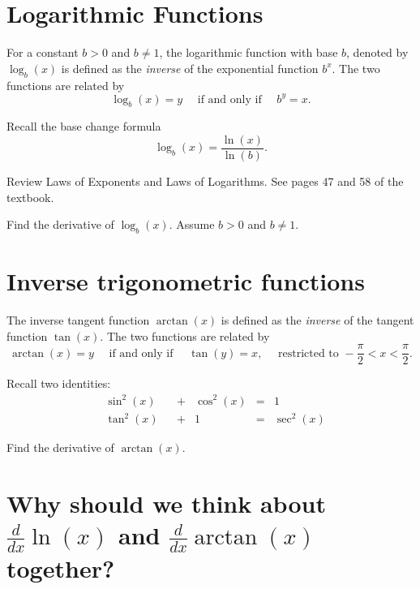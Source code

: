 \documentclass[../main.tex]{subfiles}
\begin{document}
\section{Logarithmic Functions}
For a constant \(b > 0\) and \(b \ne 1\), the logarithmic function with base \(b\), denoted by \(\log_{b}(x)\) is defined as the \emph{inverse} of the exponential function \(b^{x}\). The two functions are related by
\[
  \log_{b}(x) = y \quad\text{ if and only if }\quad b^{y} = x.
\]

\begin{mdframed}[style=sidenote]
  Recall the base change formula
  \[
    \log_{b}(x) = \frac{\ln(x)}{\ln(b)}.
  \]

  Review Laws of Exponents and Laws of Logarithms. See pages 47 and 58 of the textbook.
\end{mdframed}


\begin{example}
  Find the derivative of \(\log_{b}(x)\).  Assume \(b > 0\) and \(b \ne 1\).
\end{example}

\clearpage

\section{Inverse trigonometric functions}
The inverse tangent function \(\arctan(x)\) is defined as the \emph{inverse} of the tangent function \(\tan(x)\). The two functions are related by
\[
  \arctan(x) = y \quad\text{ if and only if }\quad \tan(y) = x, \quad\text{ restricted to } -\frac{\pi}{2} < x < \frac{\pi}{2}.
\]
\begin{mdframed}[style=sidenote]
  Recall two identities:
  \begin{align*}
    &\sin^{2}(x)& &+ &\cos^{2}(x) & = &1 \\[1ex]
    &\tan^{2}(x)& &+ &1& = &\sec^{2}(x)
  \end{align*}
\end{mdframed}
\begin{example}
  Find the derivative of \(\arctan(x)\). 
\end{example}
\clearpage

\section{Why should we think about \texorpdfstring{\(\frac{d}{dx}\ln(x)\)}{ln'(x)} and \texorpdfstring{\(\frac{d}{dx}\arctan(x)\)}{arctan'(x)} together?}
\end{document}
